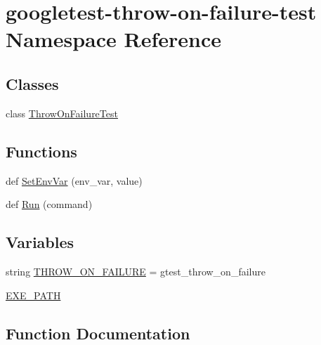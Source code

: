 \hypertarget{namespacegoogletest-throw-on-failure-test}{}\section{googletest-\/throw-\/on-\/failure-\/test Namespace Reference}
\label{namespacegoogletest-throw-on-failure-test}
\subsection*{Classes}
\begin{DoxyCompactItemize}
\item 
class \mbox{\hyperlink{classgoogletest-throw-on-failure-test_1_1ThrowOnFailureTest}{Throw\+On\+Failure\+Test}}
\end{DoxyCompactItemize}
\subsection*{Functions}
\begin{DoxyCompactItemize}
\item 
def \mbox{\hyperlink{namespacegoogletest-throw-on-failure-test_a2e2bb374a68e4ae1db7c359b8005cbcc}{Set\+Env\+Var}} (env\+\_\+var, value)
\item 
def \mbox{\hyperlink{namespacegoogletest-throw-on-failure-test_a937ab7ba6dcd93d71b1997f2bbfe3804}{Run}} (command)
\end{DoxyCompactItemize}
\subsection*{Variables}
\begin{DoxyCompactItemize}
\item 
string \mbox{\hyperlink{namespacegoogletest-throw-on-failure-test_a7c90464af153ebb6f0e221d66dbc71f1}{T\+H\+R\+O\+W\+\_\+\+O\+N\+\_\+\+F\+A\+I\+L\+U\+RE}} = \textquotesingle{}gtest\+\_\+throw\+\_\+on\+\_\+failure\textquotesingle{}
\item 
\mbox{\hyperlink{namespacegoogletest-throw-on-failure-test_a9cf7f6bcb466c8346b1aacec917a09c1}{E\+X\+E\+\_\+\+P\+A\+TH}}
\end{DoxyCompactItemize}


\subsection{Function Documentation}
\mbox{\label{namespacegoogletest-throw-on-failure-test_a937ab7ba6dcd93d71b1997f2bbfe3804}} 
